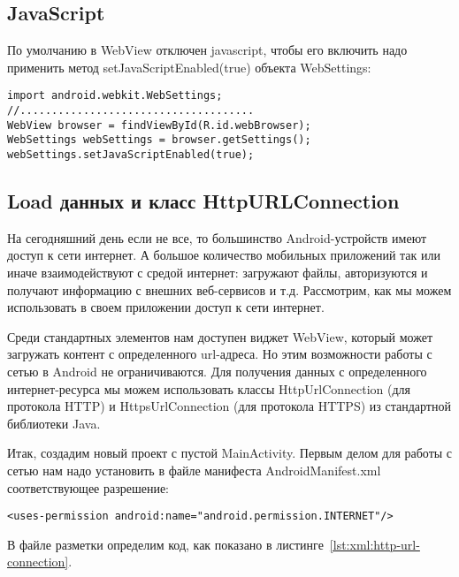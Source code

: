 \subsection{JavaScript}

По умолчанию в WebView отключен javascript, чтобы его включить надо
применить метод setJavaScriptEnabled(true) объекта WebSettings:

\begin{verbatim}
import android.webkit.WebSettings;
//.....................................
WebView browser = findViewById(R.id.webBrowser);
WebSettings webSettings = browser.getSettings();
webSettings.setJavaScriptEnabled(true);
\end{verbatim}

\subsection{Load данных и класс HttpURLConnection}
На сегодняшний день если не все, то большинство Android-устройств имеют
доступ к сети интернет. А большое количество мобильных приложений так
или иначе взаимодействуют с средой интернет: загружают файлы,
авторизуются и получают информацию с внешних веб-сервисов и т.д.
Рассмотрим, как мы можем использовать в своем приложении доступ к сети
интернет.\par
Среди стандартных элементов нам доступен виджет WebView, который
может загружать контент с определенного url-адреса. Но этим возможности
работы с сетью в Android не ограничиваются. Для получения данных с
определенного интернет-ресурса мы можем использовать классы
HttpUrlConnection (для протокола HTTP) и HttpsUrlConnection (для
протокола HTTPS) из стандартной библиотеки Java.\par
Итак, создадим новый проект с пустой MainActivity. Первым делом для
работы с сетью нам надо установить в файле манифеста
AndroidManifest.xml соответствующее разрешение:

\begin{verbatim}
<uses-permission android:name="android.permission.INTERNET"/>
\end{verbatim}

В файле разметки определим код, как показано
в листинге~\ref{lst:xml:http-url-connection}.

